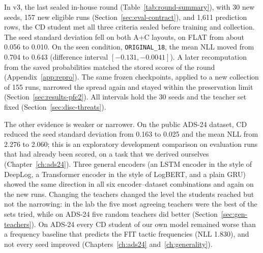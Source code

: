 In v3, the last sealed in-house round (Table~\ref{tab:round-summary}), with
30 new seeds, 157 new eligible runs (Section~\ref{sec:eval-contract}),
and 1,611 prediction rows, the CD student met all three criteria sealed
before training and collection. The seed standard deviation fell on
both A+C layouts, on FLAT from about 0.056 to 0.010. On the seen
condition, \texttt{ORIGINAL\_18}, the mean NLL moved from 0.704 to
0.643 (difference interval $[-0.131, -0.0041]$). A later recomputation
from the saved probabilities matched the stored scores of the round
(Appendix~\ref{app:repro}). The same frozen checkpoints, applied to a
new collection of 155 runs, narrowed the spread again and stayed within
the preservation limit (Section~\ref{sec:results-pfc2}). All intervals
hold the 30 seeds and the teacher set fixed (Section~\ref{sec:disc-threats}).

The other evidence is weaker or narrower. On the public ADS-24
dataset, CD reduced the seed standard deviation from 0.163 to 0.025 and
the mean NLL from 2.276 to 2.060; this is an exploratory development
comparison on evaluation runs that had already been scored, on a task
that we derived ourselves (Chapter~\ref{ch:ads24}). Three general
encoders (an LSTM encoder in the style of DeepLog, a Transformer
encoder in the style of LogBERT, and a plain GRU) showed the same
direction in all six encoder--dataset combinations and again on the
new runs. Changing the teachers changed the level the students reached
but not the narrowing: in the lab the five most agreeing teachers were
the best of the sets tried, while on ADS-24 five random teachers did
better (Section~\ref{sec:gen-teachers}). On ADS-24 every CD student of
our own model remained worse than a frequency baseline that predicts
the FIT tactic frequencies (NLL 1.830), and not every seed improved
(Chapters~\ref{ch:ads24} and~\ref{ch:generality}).

